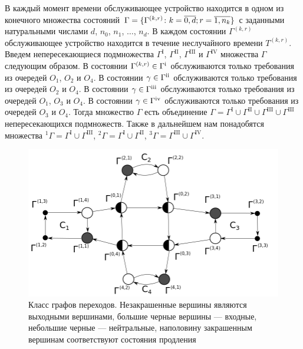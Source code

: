 \documentclass[11pt]{ubs}
\newcommand{\Rmnum}[1]{\romannumeral #1}
\begin{document}
В каждый момент времени обслуживающее устройство находится в одном из конечного множества состояний $\Gamma=\{\Gamma^{(k,r)} \colon k =\nobreak\discretionary{}{\hbox{$\mathsurround=0pt =$}}{}\overline{0,d}; r=\overline{1,n_k}\}$ с заданными натуральными числами $d$, $n_0$, $n_1$, $\ldots$, $n_d$. В каждом состоянии $\Gamma^{(k,r)}$ обслуживающее устройство находится в течение неслучайного времени $T^{(k,r)}$. 
Введем непересекающиеся подмножества $\Gamma^{\mathrm{I}}$, $\Gamma^{\mathrm{II}}$, $\Gamma^{\mathrm{III}}$ и $\Gamma^{\mathrm{IV}}$ множества $\Gamma$ следующим образом. 
В состоянии $\Gamma^{(k,r)} \in \Gamma^{\mathrm{\Rmnum{1}}}$ 
обслуживаются только требования из очередей $O_1$, $O_2$ и $O_4$.
В состоянии $\gamma \in \Gamma^{\mathrm{\Rmnum{2}}}$ обслуживаются только требования из очередей $O_2$ и $O_4$.
В состоянии $\gamma \in \Gamma^{\mathrm{\Rmnum{3}}}$ обслуживаются только требования из очередей $O_1$, $O_3$ и $O_4$.
В состоянии $\gamma \in \Gamma^{\mathrm{\Rmnum{4}}}$ обслуживаются только требования из очередей $O_3$ и $O_4$.
Тогда множество $\Gamma$ есть объединение $\Gamma = \Gamma^{\mathrm{I}} \cup \Gamma^{\mathrm{II}} \cup \Gamma^{\mathrm{III}} \cup \Gamma^{\mathrm{III}}$ непересекающихся подмножеств. Также в дальнейшем нам понадобятся множества ${}^1\Gamma=\Gamma^{\mathrm{I}} \cup \Gamma^{\mathrm{III}}$, 
${}^2\Gamma=\Gamma^{\mathrm{I}} \cup \Gamma^{\mathrm{II}}$,
${}^3\Gamma=\Gamma^{\mathrm{III}} \cup \Gamma^{\mathrm{IV}}$. 
\begin{figure}[h]\centering
\includegraphics[scale=0.35]{GraphScheme3_grayscale.png} 
\caption{Класс графов переходов. Незакрашенные вершины являются выходными вершинами, большие черные вершины --- входные, небольшие черные --- нейтральные, наполовину закрашенным вершинам соответствуют состояния продления}
\label{GraphScheme}
\end{figure}
\end{document}
